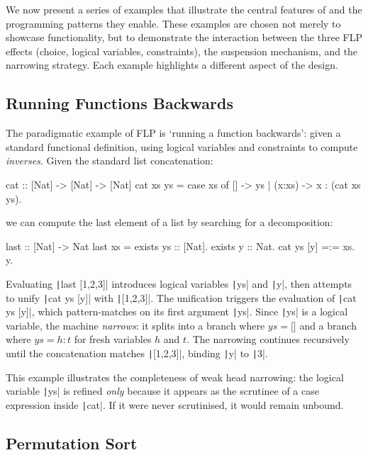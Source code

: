 We now present a series of examples that illustrate the central features of
\Gweek{} and the programming patterns they enable. These examples are chosen not
merely to showcase functionality, but to demonstrate the interaction between the
three FLP effects (choice, logical variables, constraints), the suspension
mechanism, and the narrowing strategy. Each example highlights a different
aspect of the design.

\subsection{Running Functions Backwards}

The paradigmatic example of FLP is `running a function backwards': given a
standard functional definition, using logical variables and constraints to
compute \emph{inverses}. Given the standard list concatenation:
%
\begin{haskellcode}
cat :: [Nat] -> [Nat] -> [Nat]
cat xs ys = case xs of
      [] -> ys
    | (x:xs) -> x : (cat xs ys).
\end{haskellcode}
%
\noindent we can compute the last element of a list by searching for a
decomposition:
%
\begin{haskellcode}
last :: [Nat] -> Nat
last xs = exists ys :: [Nat]. exists y :: Nat.
    cat ys [y] =:= xs. y.
\end{haskellcode}
%
\noindent Evaluating \texttt|last [1,2,3]| introduces logical
variables \texttt|ys| and \texttt|y|, then attempts
to unify \texttt|cat ys [y]| with \texttt|[1,2,3]|.
The unification triggers the evaluation of \texttt|cat ys [y]|,
which pattern-matches on its first argument \texttt|ys|. Since
\texttt|ys| is a logical variable, the machine \emph{narrows}:
it splits into a branch where $\mathit{ys} = \texttt{[]}$ and a branch where
$\mathit{ys} = h : t$ for fresh variables $h$ and $t$. The narrowing continues
recursively until the concatenation matches \texttt|[1,2,3]|,
binding \texttt|y| to \texttt|3|.

This example illustrates the completeness of weak head narrowing: the logical
variable \texttt|ys| is refined \emph{only} because it appears as
the scrutinee of a case expression inside \texttt|cat|. If it were
never scrutinised, it would remain unbound.

\subsection{Permutation Sort}

